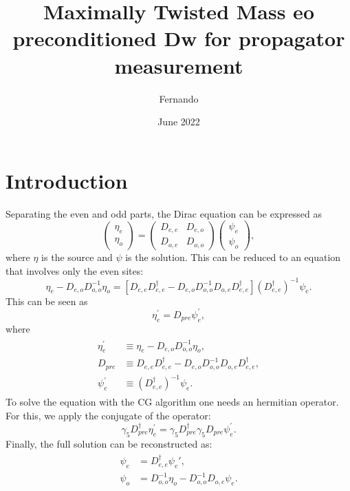 \documentclass{article}
\title{Maximally Twisted Mass eo preconditioned Dw for propagator measurement}
\author{Fernando }
\date{June 2022}
\begin{document}
\maketitle

\section{Introduction}

Separating the even and odd parts, the Dirac equation can be expressed as
\begin{equation}
\left(\begin{array}{l}
\eta_{e} \\
\eta_{o}
\end{array}\right)=\left(\begin{array}{cc}
D_{e, e} & D_{e, o} \\
D_{o, e} & D_{o, o}
\end{array}\right)\left(\begin{array}{l}
\psi_{e} \\
\psi_{o}
\end{array}\right),
\end{equation}
where $\eta$ is the source and $\psi$ is the solution. This can be reduced to an equation that involves only the even sites:
\begin{equation}
    \eta_{e}-D_{e, o} D_{o, o}^{-1} \eta_{o}=\left[D_{e, e} D_{e, e}^{\dagger}-D_{e, o} D_{o, o}^{-1} D_{o, e} D_{e, e}^{\dagger}\right]\left(D_{e, e}^{\dagger}\right)^{-1} \psi_{e}.
\end{equation}
This can be seen as
\begin{equation}
\eta_{e}^{\prime}=D_{p r e} \psi_{e}^{\prime},
\end{equation}
where
\begin{align}
\begin{split}
\eta_{e}^{\prime} &\equiv \eta_{e}-D_{e, o} D_{o, o}^{-1} \eta_{o}, \\
D_{p r e} &\equiv D_{e, e} D_{e, e}^{\dagger}-D_{e, o} D_{o, o}^{-1} D_{o, e} D_{e, e}^{\dagger}, \\
\psi_{e}^{\prime} &\equiv\left(D_{e, e}^{\dagger}\right)^{-1} \psi_{e}.
\end{split}
\end{align}
To solve the equation with the CG algorithm one needs an hermitian operator. For this, we apply the conjugate of the operator:
\begin{equation}
\gamma_{5} D_{p r e}^{\dagger} \eta_{e}^{\prime}=\gamma_{5} D_{p r e}^{\dagger} \gamma_{5} D_{p r e} \psi_{e}^{\prime}.
\end{equation}
Finally, the full solution can be reconstructed as:
\begin{align}
\begin{split} 
\psi_e &= D_{e, e}^{\dagger} \psi_e', \\
\psi_{o}&=D_{o, o}^{-1} \eta_{o}-D_{o, o}^{-1} D_{o, e} \psi_{e}.
\end{split}
\end{align}
\end{document}
